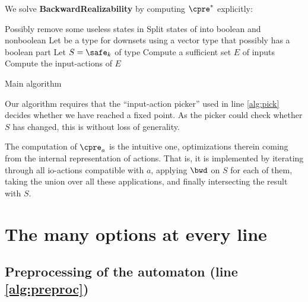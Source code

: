 \documentclass[runningheads,a4paper]{llncs}
\begin{document}
We
solve \textbf{BackwardRealizability} by computing
\(\cpre^*\) explicitly:

\vspace{0.5em}

\begin{algorithm}[H]
  \LinesNumbered
{}

\BlankLine

Possibly remove some useless states in \cA\;\label{alg:preproc}
Split states of \cA into boolean and nonboolean\;\label{alg:bool}
Let \Downset be a type for downsets using a vector type that possibly has a
boolean part\;\label{alg:types}
Let \(S = \safe_k\) of type \Downset\;
Compute a sufficient set \(E\) of  inputs\;\label{alg:inputs}
Compute the input-actions of \(E\)\;\label{alg:actions}
\caption{Main algorithm}\label{main_algo}
\end{algorithm}

\vspace{0.5em}

Our algorithm requires that the ``input-action picker'' used in line \ref{alg:pick}
decides whether we have reached a fixed point.  As the picker could check
whether \(S\) has changed, this is without loss of generality.

The computation of \(\cpre_a\) is the intuitive one, optimizations therein coming
from the internal representation of actions.  That is, it is implemented by
iterating through all io-actions compatible with \(a\), applying \(\bwd\) on
\(S\) for each of them, taking the union over all these applications, and finally
intersecting the result with \(S\).

\section{The many options at every line}\label{sec:implem}

\subsection{Preprocessing of the automaton (line \ref{alg:preproc})}\label{sec:preproc}
\end{document}
